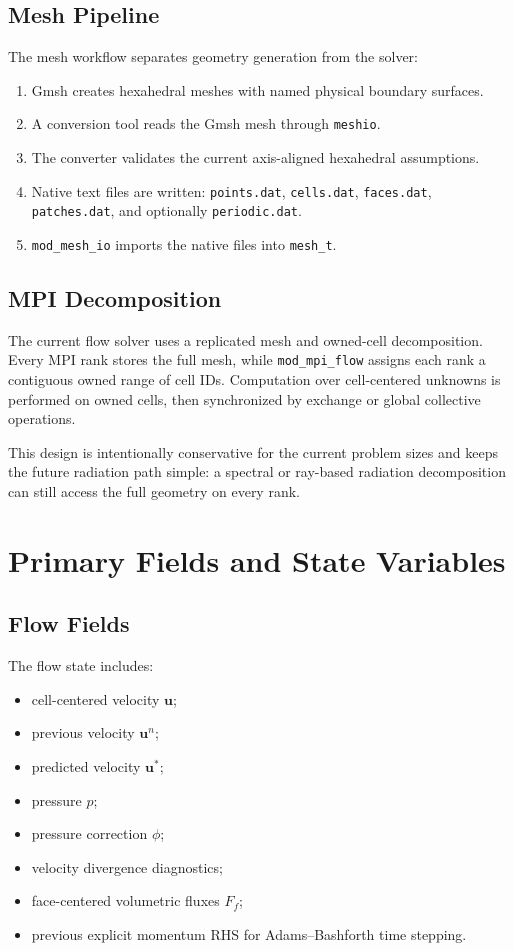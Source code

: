 \documentclass[11pt]{article}
\begin{document}
\subsection{Mesh Pipeline}

The mesh workflow separates geometry generation from the solver:
\begin{enumerate}[leftmargin=*]
  \item Gmsh creates hexahedral meshes with named physical boundary surfaces.
  \item A conversion tool reads the Gmsh mesh through \texttt{meshio}.
  \item The converter validates the current axis-aligned hexahedral assumptions.
  \item Native text files are written:
        \texttt{points.dat}, \texttt{cells.dat}, \texttt{faces.dat},
        \texttt{patches.dat}, and optionally \texttt{periodic.dat}.
  \item \texttt{mod\_mesh\_io} imports the native files into \texttt{mesh\_t}.
\end{enumerate}

\subsection{MPI Decomposition}

The current flow solver uses a replicated mesh and owned-cell decomposition.
Every MPI rank stores the full mesh, while \texttt{mod\_mpi\_flow} assigns each
rank a contiguous owned range of cell IDs.  Computation over cell-centered
unknowns is performed on owned cells, then synchronized by exchange or global
collective operations.

This design is intentionally conservative for the current problem sizes and
keeps the future radiation path simple: a spectral or ray-based radiation
decomposition can still access the full geometry on every rank.

\section{Primary Fields and State Variables}

\subsection{Flow Fields}

The flow state includes:
\begin{itemize}[leftmargin=*]
  \item cell-centered velocity \(\mathbf{u}\);
  \item previous velocity \(\mathbf{u}^n\);
  \item predicted velocity \(\mathbf{u}^{*}\);
  \item pressure \(p\);
  \item pressure correction \(\phi\);
  \item velocity divergence diagnostics;
  \item face-centered volumetric fluxes \(F_f\);
  \item previous explicit momentum RHS for Adams--Bashforth time stepping.
\end{itemize}
\end{document}
